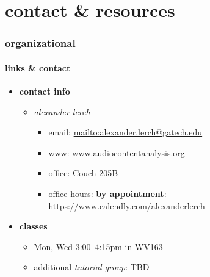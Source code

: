 


\subtitle{Part 1: Organizational}


	

    \section[contact]{contact \& resources}
        \begin{frame}\frametitle{organizational}\framesubtitle{links \& contact}
            \begin{itemize}
                \item \textbf{contact info}
                    \begin{itemize}
                        \item   \textit{alexander lerch}
                            \begin{itemize}
                                \item   {email}: \url{mailto:alexander.lerch@gatech.edu}
                                \item   {www}: \url{www.audiocontentanalysis.org}
                                \item   {office}: Couch 205B
                                \item   {office hours}:  \textbf{by appointment}: \url{https://www.calendly.com/alexanderlerch}
                            \end{itemize}
                    \end{itemize}
                
                \smallskip
                \item<2-> \textbf{classes}
                    \begin{itemize}
                        \item   Mon, Wed  3:00--4:15pm in WV163
                        \item   additional \textit{tutorial group}: TBD
                    \end{itemize}
                

\end{itemize}
\end{frame}

